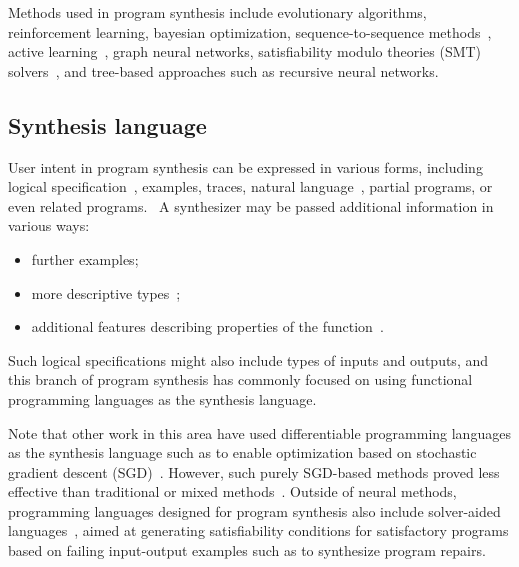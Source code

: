 \documentclass{article}
\begin{document}


Methods used in program synthesis include evolutionary algorithms, reinforcement learning, bayesian optimization, sequence-to-sequence methods~\citep{neuralmachinetranslation}, active learning~\citep{shen2019using}, graph neural networks, satisfiability modulo theories (SMT) solvers~\citep{rosette,hornclauses,architecture}, and tree-based approaches such as recursive neural networks.


\subsection{Synthesis language}

User intent in program synthesis can be expressed in various forms, including logical specification~\citep{temporalstreamlogic},
examples, traces, natural language~\citep{abstractsyntaxnetworks}, partial programs, or even related programs.~\citep{gulwani2017program}
A synthesizer may be passed additional information in various ways:
\begin{itemize}
    \item further examples;
    \item more descriptive types~\citep{synquid};
    \item additional features describing properties of the function~\citep{odena2020learning}.
\end{itemize}

Such logical specifications might also include types of inputs and outputs,
and this branch of program synthesis has commonly focused on using functional programming languages as the synthesis language.%
~\citep{synquid,eguchi2018automated,scythe,scout,gissurarson2018suggesting,idris,lenses}

Note that other work in this area have used differentiable programming languages
as the synthesis language such as to enable optimization based on
stochastic gradient descent (SGD)~\citep{forth,terpret}.
However, such purely SGD-based methods proved less effective than traditional or mixed methods~\citep{terpret}.
Outside of neural methods, programming languages designed for program synthesis also include solver-aided languages~\citep{rosette},
aimed at generating satisfiability conditions for satisfactory programs based on failing input-output examples such as to synthesize program repairs.
\end{document}
